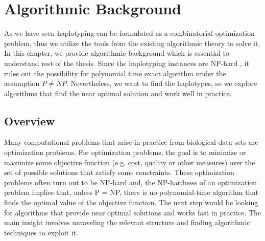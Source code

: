 \chapter{Algorithmic Background}
As we have seen haplotyping can be formulated as a combinatorial optimization problem, thus we utilize the tools from  the existing algorithmic theory to solve it.
In this chapter, we provide algorithmic background which is essential to understand rest of the thesis.
Since the haplotyping instances are NP-hard \citep{Cilibrasi2007}, it rules out the possibility for polynomial time exact algorithm under the assumption $P \neq NP$.
Nevertheless, we want to find the haplotypes, so we explore algorithms that find the near optimal solution and work well in practice.


\section{Overview}
Many computational problems that arise in practice from biological data sets are optimization problems.
For optimization problems, the goal is to minimize or maximize some objective function (e.g. cost, quality or other measures) over the set of possible solutions that satisfy some constraints.
These optimization problems often turn out to be NP-hard and, the
NP-hardness of an optimization problem implies that, unless P = NP, there is no polynomial-time algorithm
that finds the optimal value of the objective function. 
The next step would be looking for algorithms that provide near optimal solutions and works fast in practice. 
The main insight involves unraveling the relevant structure and finding algorithmic
techniques to exploit it. 

